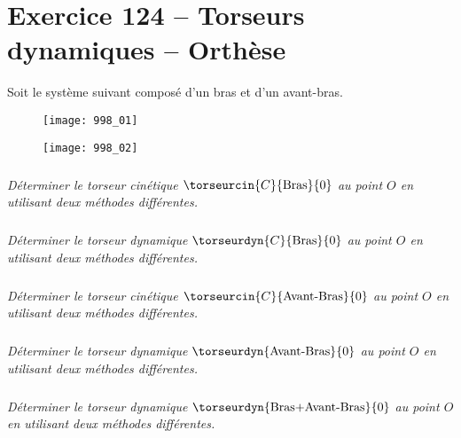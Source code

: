 \section*{Exercice 124 -- Torseurs dynamiques -- Orthèse}
\setcounter{exo}{0}


Soit le système suivant composé d'un bras et d'un avant-bras.

\begin{figure}[H]
\centering
\texttt{[image: 998\_01]}
\end{figure}

\begin{figure}[H]
\centering
\texttt{[image: 998\_02]}
\end{figure}

\subparagraph{}
\textit{Déterminer le torseur cinétique $\torseurcin{C}{\text{Bras}}{0}$ au point $O$ en utilisant deux méthodes différentes.}
\ifprof
\begin{corrige}
\end{corrige}
\else
\fi

\subparagraph{}
\textit{Déterminer le torseur dynamique $\torseurdyn{C}{\text{Bras}}{0}$ au point $O$ en utilisant deux méthodes différentes.}
\ifprof
\begin{corrige}
\end{corrige}
\else
\fi

\subparagraph{}
\textit{Déterminer le torseur cinétique $\torseurcin{C}{\text{Avant-Bras}}{0}$ au point $O$ en utilisant deux méthodes différentes.}
\ifprof
\begin{corrige}
\end{corrige}
\else
\fi

\subparagraph{}
\textit{Déterminer le torseur dynamique $\torseurdyn{\text{Avant-Bras}}{0}$ au point $O$ en utilisant deux méthodes différentes.}
\ifprof
\begin{corrige}
\end{corrige}
\else
\fi


\subparagraph{}
\textit{Déterminer le torseur dynamique $\torseurdyn{\text{Bras+Avant-Bras}}{0}$ au point $O$ en utilisant deux méthodes différentes.}
\ifprof
\begin{corrige}
\end{corrige}
\else
\fi

